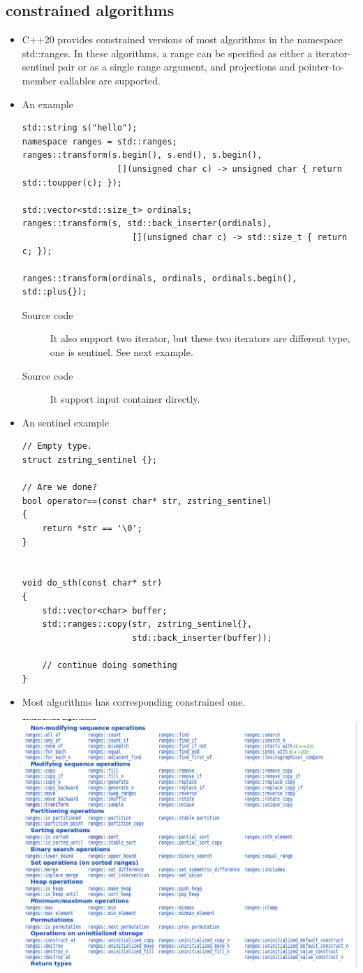 \documentclass[a4paper,11pt,twoside]{book}
\begin{document}
\subsection{constrained algorithms}
\begin{itemize}
		\item C++20 provides constrained versions of most algorithms in the namespace std::ranges. In these algorithms, a range can be specified as either a iterator-sentinel pair or as a single range argument, and projections and pointer-to-member callables are supported. 
		\item An example
\begin{lstlisting}
std::string s("hello");
namespace ranges = std::ranges;
ranges::transform(s.begin(), s.end(), s.begin(),
                   [](unsigned char c) -> unsigned char { return std::toupper(c); });
 
std::vector<std::size_t> ordinals;
ranges::transform(s, std::back_inserter(ordinals),
                      [](unsigned char c) -> std::size_t { return c; });
 
ranges::transform(ordinals, ordinals, ordinals.begin(), std::plus{});
\end{lstlisting}
\begin{description}
		\item[Source code] It also support two iterator, but these two iterators are different type, one is sentinel. See next example.
		\item[Source code] It support input container directly.
\end{description}
		\item An sentinel example
\begin{lstlisting}
// Empty type.
struct zstring_sentinel {};

// Are we done?
bool operator==(const char* str, zstring_sentinel)
{
    return *str == '\0';
}


void do_sth(const char* str)
{
    std::vector<char> buffer;
    std::ranges::copy(str, zstring_sentinel{},
                      std::back_inserter(buffer));

    // continue doing something
}
\end{lstlisting}
\item Most algorithms has corresponding constrained one.

\includegraphics[width=0.85\linewidth]{pics/ca.png}

\end{itemize}
\end{document}
